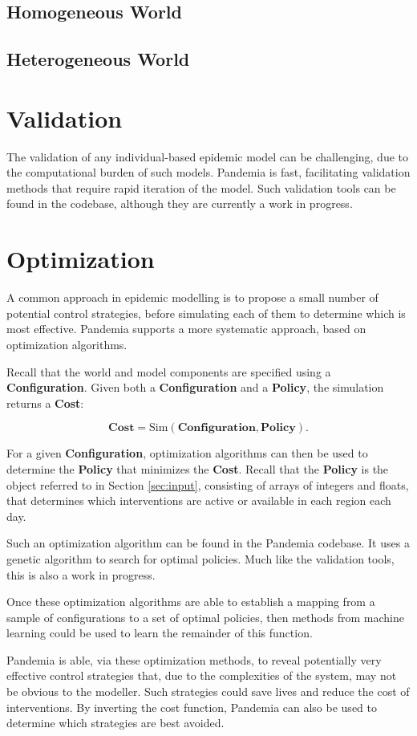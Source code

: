 \documentclass[10pt,letterpaper]{article}
\begin{document}
\subsection{Homogeneous World}

\subsection{Heterogeneous World}

\section{Validation}

The validation of any individual-based epidemic model can be challenging, due to the computational burden of such models. Pandemia is fast, facilitating validation methods that require rapid iteration of the model. Such validation tools can be found in the codebase, although they are currently a work in progress.

\section{Optimization}

A common approach in epidemic modelling is to propose a small number of potential control strategies, before simulating each of them to determine which is most effective. Pandemia supports a more systematic approach, based on optimization algorithms.

Recall that the world and model components are specified using a \textbf{Configuration}. Given both a \textbf{Configuration} and a \textbf{Policy}, the simulation returns a \textbf{Cost}:

$$\textbf{Cost} = \text{Sim}(\textbf{Configuration}, \textbf{Policy}).$$

For a given \textbf{Configuration}, optimization algorithms can then be used to determine the \textbf{Policy} that minimizes the \textbf{Cost}. Recall that the \textbf{Policy} is the object referred to in Section \ref{sec:input}, consisting of arrays of integers and floats, that determines which interventions are active or available in each region each day.

Such an optimization algorithm can be found in the Pandemia codebase. It uses a genetic algorithm to search for optimal policies. Much like the validation tools, this is also a work in progress.

Once these optimization algorithms are able to establish a mapping from a sample of configurations to a set of optimal policies, then methods from machine learning could be used to learn the remainder of this function.

Pandemia is able, via these optimization methods, to reveal potentially very effective control strategies that, due to the complexities of the system, may not be obvious to the modeller. Such strategies could save lives and reduce the cost of interventions. By inverting the cost function, Pandemia can also be used to determine which strategies are best avoided.

% 
\end{document}
